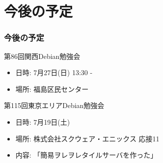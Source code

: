 \documentclass[cjk,dvipdfmx,10pt,compress,%
hyperref={bookmarks=true,bookmarksnumbered=true,bookmarksopen=false,%
colorlinks=false,%
pdftitle={第 85 回 関西 Debian 勉強会},%
pdfauthor={倉敷・のがた・佐々木・かわだ・八津尾},%
pdfsubject={資料},%
}]{beamer}
\begin{document}
\section{今後の予定}
\begin{frame}[fragile]
\frametitle{今後の予定}

\begin{block}{第86回関西Debian勉強会}
  \begin{itemize}
  \item 日時: 7月27日(日) 13:30 -
  \item 場所: 福島区民センター
  \end{itemize}
\end{block}

\begin{block}{第115回東京エリアDebian勉強会}
  \begin{itemize}
  \item 日時: 7月19日(土)
  \item 場所: 株式会社スクウェア・エニックス 応接11
  \item 内容: 「簡易ヲレヲレタイルサーバを作った」
  \end{itemize}
\end{block}

\end{frame}

\takahashi[50]{  }
\end{document}
